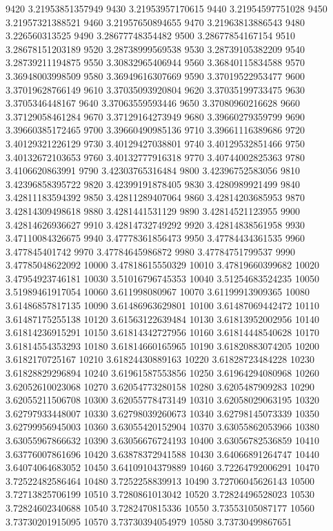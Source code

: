 {9420 3.21953851357949
9430 3.21953957170615
9440 3.21954597751028
9450 3.21957321388521
9460 3.21957650894655
9470 3.21963813886543
9480 3.226560313525
9490 3.28677748354482
9500 3.28677854167154
9510 3.28678151203189
9520 3.28738999569538
9530 3.28739105382209
9540 3.28739211194875
9550 3.30832965406944
9560 3.36840115834588
9570 3.36948003998509
9580 3.36949616307669
9590 3.37019522953477
9600 3.37019628766149
9610 3.37035093920804
9620 3.37035199733475
9630 3.3705346448167
9640 3.37063559593446
9650 3.37080960216628
9660 3.37129058461284
9670 3.37129164273949
9680 3.39660279359799
9690 3.39660385172465
9700 3.39660490985136
9710 3.39661116389686
9720 3.40129321226129
9730 3.40129427038801
9740 3.40129532851466
9750 3.40132672103653
9760 3.40132777916318
9770 3.40744002825363
9780 3.4106620863991
9790 3.42303765316484
9800 3.42396752583056
9810 3.42396858395722
9820 3.42399191878405
9830 3.4280989921499
9840 3.42811183594392
9850 3.42811289407064
9860 3.42814203685953
9870 3.42814309498618
9880 3.4281441531129
9890 3.42814521123955
9900 3.42814626936627
9910 3.42814732749292
9920 3.42814838561958
9930 3.47110084326675
9940 3.47778361856473
9950 3.47784434361535
9960 3.477845401742
9970 3.47784645986872
9980 3.47784751799537
9990 3.47785048622092
10000 3.47818615550329
10010 3.47819660399682
10020 3.47954923746181
10030 3.51016796745353
10040 3.51254683524235
10050 3.51989461917054
10060 3.611998080967
10070 3.61199913909365
10080 3.61486857817135
10090 3.61486963629801
10100 3.61487069442472
10110 3.61487175255138
10120 3.61563122639484
10130 3.61813952002956
10140 3.61814236915291
10150 3.61814342727956
10160 3.61814448540628
10170 3.61814554353293
10180 3.61814660165965
10190 3.61820883074205
10200 3.6182170725167
10210 3.61824430889163
10220 3.61828723484228
10230 3.61828829296894
10240 3.61961587553856
10250 3.61964294080968
10260 3.62052610023068
10270 3.62054773280158
10280 3.6205487909283
10290 3.62055211506708
10300 3.62055778473149
10310 3.62058029063195
10320 3.62797933448007
10330 3.62798039260673
10340 3.62798145073339
10350 3.62799956945003
10360 3.63055420152904
10370 3.63055862053966
10380 3.63055967866632
10390 3.63056676724193
10400 3.63056782536859
10410 3.63776007861696
10420 3.63878372941588
10430 3.64066891264747
10440 3.64074064683052
10450 3.64109104379889
10460 3.72264792006291
10470 3.72522482586464
10480 3.7252258839913
10490 3.72706045626143
10500 3.72713825706199
10510 3.7280861013042
10520 3.72824496528023
10530 3.72824602340688
10540 3.7282470815336
10550 3.73553105087177
10560 3.73730201915095
10570 3.73730394054979
10580 3.73730499867651
}
